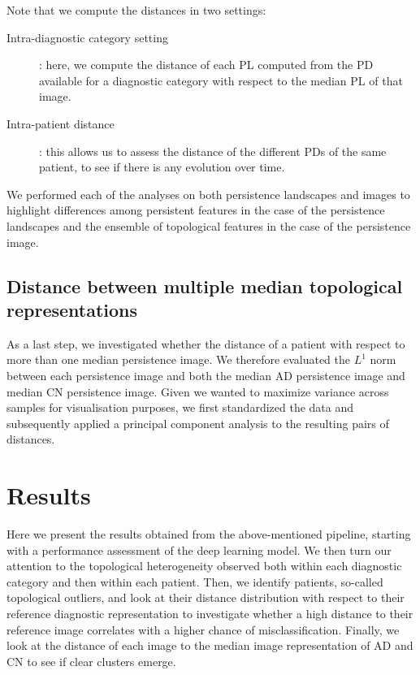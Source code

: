 \documentclass{article}
\begin{document}
Note that we compute the distances in two settings:
\begin{description}
\item[Intra-diagnostic category setting]: here, we compute the
distance of each PL computed from the PD available for a diagnostic category with respect to the median PL of that image.
\item[Intra-patient distance]: this allows us to assess the distance of the different PDs of the same patient, to see if there is any evolution over time.
\end{description}
We performed each of the analyses on both persistence landscapes and images to highlight differences among persistent features in the case of the persistence landscapes and the ensemble of topological features in the case of the persistence image.


\subsection{Distance between multiple median topological representations}\label{sec:methods_dist_multiple_images}

As a last step, we investigated whether the distance of a patient with respect to more than one median persistence image. We therefore evaluated the $L^1$ norm between each persistence image and both the median AD persistence image and median CN persistence image. Given we wanted to maximize variance across samples for visualisation purposes, we first standardized the data and subsequently applied a principal component analysis to the resulting pairs of distances.

\section{Results}\label{sec:results}

Here we present the results obtained from the above-mentioned pipeline, starting with a performance assessment of the deep learning model. We then turn our attention to the topological heterogeneity observed both within each diagnostic category and then within each patient. Then, we identify patients, so-called topological outliers, and look at their distance distribution with respect to their reference diagnostic representation to investigate whether a high distance to their reference image correlates with a higher chance of misclassification. Finally, we look at the distance of each image to the median image representation of AD and CN to see if clear clusters emerge.
\end{document}
